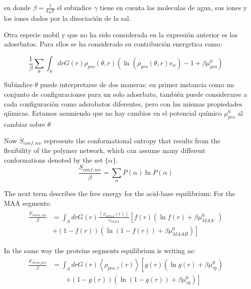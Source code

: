 \noindent en donde $\beta = \frac{1}{k_BT}$  el subindice $\gamma$ tiene en cuenta las moleculas de agua, sus iones y los iones dados por la disociaci\'on de la sal.

Otra especie mobil y que no ha sido considerada en la expresi\'on anterior es los adosrbatos. Para ellos se ha considerado su contribuci\'on energetica como:

\begin{equation}
\frac{1}{\beta}\sum_{\theta}\int_S{dr G(r)\rho_{pro}(\theta,r)\left(\ln \left(\rho_{pro}(\theta,r)v_w\right) -1 + \beta\mu^0_{pro} \right)}
\end{equation}

Subindice $\theta$ puede interpretarse de dos maneras: en primer instancia como un conjunto de configuraciones para un solo adosrbato, tambi\'en puede considerarse a cada configuraci\'on como adsrobatos diferentes, pero con las mismas propiedades qi\'imicas.
Estamos asumiendo que no hay cambios en el potencial qu\'imico  $\mu^0_{pro}$ al cambiar sobre $\theta$ 

Now $S_{conf,nw}$ represents the conformational entropy that results from the flexibility of the polymer network, which can assume many different conformations denoted by the set $\{\alpha\}$. 
\begin{equation}
\frac{S_{conf,nw}}{\beta} = \sum_{\alpha}{P(\alpha)\ln P(\alpha)}
\end{equation}

The next term describes the free energy for the acid-base equilibrium:
For the MAA segments:
\begin{align}
\begin{aligned}
\frac{F_{chem,nw}}{\beta} &= \int_S drG(r) \frac{\left<\phi_{MAA}(r)\right>}{v_{MAA}} \left[f(r)(\ln f(r)+ \beta\mu^0_{MAA^-})\right.\\
&\left.+(1-f(r))(\ln (1-f(r))+\beta\mu^0_{MAAH})\right]    
\end{aligned}
\end{align} 

In the same way the proteins segments equilibrium is writing as:
\begin{align}
\begin{aligned}
\frac{F_{chem,pro}}{\beta} &=\int_S drG(r) \left<\rho_{pro,\tau}(r)\right> \left[g(r)(\ln g(r)+ \beta\mu^0_{\tau p})\right.\\
&\qquad\left.+(1-g(r))(\ln (1-g(r))+\beta\mu^0_{\tau d})\right]   
\end{aligned}
\end{align} 

